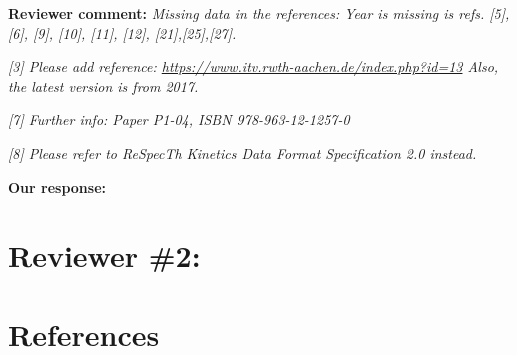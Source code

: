 \documentclass[a4paper,10pt]{elsarticle}
\begin{document}
\textbf{Reviewer comment:}
\textit{Missing data in the references: Year is missing is refs. [5], [6], [9], [10], [11], [12], [21],[25],[27].
}

\textit{[3] Please add reference: \url{https://www.itv.rwth-aachen.de/index.php?id=13}
Also, the latest version is from 2017.
}

\textit{[7] Further info:  Paper P1-04, ISBN 978-963-12-1257-0}

\textit{[8] Please refer to ReSpecTh Kinetics Data Format Specification 2.0 instead.}

\textbf{Our response:}

\section*{Reviewer \#2:}



\section*{References}


\end{document}
